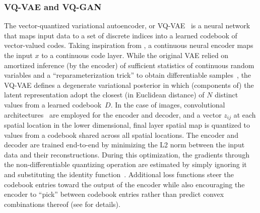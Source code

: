 \subsubsection{VQ-VAE and VQ-GAN}

The vector-quantized variational autoencoder, or VQ-VAE~\citep{oord2017vqvae} is a neural network that maps input data to a set of discrete indices into a learned codebook of vector-valued codes.
Taking inspiration from \cite{kingma2014vae}, a continuous neural encoder maps the input $x$ to a continuous code layer. While the original VAE relied on amortized inference (by the encoder) of sufficient statistics of continuous random variables and a ``reparameterization trick'' to obtain differentiable samples~\citep{williams1992simple,rezende2014reparameterizationtrick}, the VQ-VAE defines a degenerate variational posterior in which (components of) the latent representation adopt the closest (in Euclidean distance) of $N$ distinct values from a learned codebook~$D$.
In the case of images, convolutional architectures~\citep{lecun1989generalization} are employed for the encoder and decoder, and a vector $z_{ij}$ at each spatial location in the lower dimensional, final layer spatial map is quantized to values from a codebook shared across all spatial locations. The encoder and decoder are trained end-to-end by minimizing the L2 norm between the input data and their reconstructions. During this optimization, the gradients through the non-differentiable quantizing operation are estimated by simply ignoring it and substituting the identity function~\citep{hinton2012coursera,bengio2013estimating,theis2017lossy}.
Additional loss functions steer the codebook entries toward the output of the encoder while also encouraging the encoder to ``pick'' between codebook entries rather than predict convex combinations thereof (see \citet{oord2017vqvae} for details).

